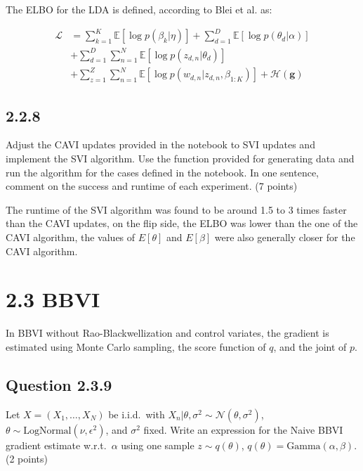 \documentclass{article}
\begin{document}
\begin{multicols}{2}
The ELBO for the LDA is defined, according to Blei et al. \cite{blei2009visualizing} as:

\begin{equation}
    \begin{aligned}
        \mathcal{L} &= \sum_{k=1}^{K} \mathbb{E}[\log p(\beta_k | \eta)]+\sum_{d=1}^{D} \mathbb{E}[\log p(\theta_d | \alpha)] \\
        &+ \sum_{d=1}^{D} \sum_{n=1}^{N} \mathbb{E}[\log p(z_{d,n} | \theta_d)] \\
        &+ \sum_{z=1}^{Z} \sum_{n=1}^{N} \mathbb{E}[\log p(w_{d,n} | z_{d,n}, \beta_{1:K})] + \mathcal{H}(\mathbf{g})
    \end{aligned}
\end{equation}

\subsection*{2.2.8}
Adjust the CAVI updates provided in the notebook to SVI updates and implement the SVI algorithm. Use the function provided for generating data and run the algorithm for the cases defined in the notebook. In one sentence, comment on the success and runtime of each experiment. (7 points)\bigskip

The runtime of the SVI algorithm was found to be around 1.5 to 3 times faster than the CAVI updates, on the flip side, the ELBO was lower
than the one of the CAVI algorithm, the values of $E[\theta]$ and $E[\beta]$ were also generally closer for the CAVI algorithm.    


\section*{2.3 BBVI}
    In BBVI without Rao-Blackwellization and control variates, the gradient is estimated using Monte Carlo sampling, the score function of \(q\), and the joint of \(p\).

    \subsection*{Question 2.3.9}
    Let \(X = (X_1, \dots, X_N)\) be i.i.d.\ with \(X_n | \theta, \sigma^2 \sim \mathcal{N}(\theta, \sigma^2)\), \(\theta \sim \text{LogNormal}(\nu, \epsilon^2)\), and \(\sigma^2\) fixed. Write an expression for the Naive BBVI gradient estimate w.r.t.\ \(\alpha\) using one sample \(z \sim q(\theta)\), \(q(\theta) = \text{Gamma}(\alpha, \beta)\). (2 points)\bigskip 


\end{multicols}
\end{document}
